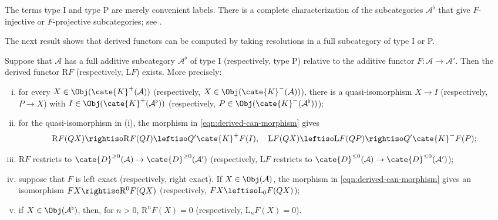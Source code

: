 The terms type I and type P are merely convenient labels. There is a complete
characterization of the subcategories $\mathcal{A}^\flat$ that give
$F$-injective or $F$-projective subcategories; see
\cite[Proposition 13.3.5]{KS06}.

The next result shows that derived functors can be computed by taking
resolutions in a full subcategory of type I or P.

\begin{theorem}\label{prop:derived-via-resolution}
	Suppose that $\mathcal{A}$ has a full additive subcategory
	$\mathcal{A}^\flat$ of type I (respectively, type P) relative to the
	additive functor $F:\mathcal{A}\to\mathcal{A}'$. Then the derived functor
	$\mathrm{R}F$ (respectively, $\mathrm{L}F$) exists. More precisely:
	\begin{enumerate}[(i)]
		\item for every $X\in\Obj(\cate{K}^+(\mathcal{A}))$ (respectively,
		$X\in\Obj(\cate{K}^-(\mathcal{A}))$), there is a quasi-isomorphism
		$X\to I$ (respectively, $P\to X$) with
		$I\in\Obj(\cate{K}^+(\mathcal{A}^\flat))$ (respectively,
		$P\in\Obj(\cate{K}^-(\mathcal{A}^\flat))$);
		\item for the quasi-isomorphism in (i), the morphism in
		\eqref{eqn:derived-can-morphism} gives
		\[ \mathrm{R}F(QX) \rightiso \mathrm{R}F(QI) \leftiso Q' \cate{K}^+ F(I), \quad \mathrm{L}F(QX) \leftiso \mathrm{L}F(QP) \rightiso Q' \cate{K}^- F(P); \]
		\item $\mathrm{R}F$ restricts to
		$\cate{D}^{\geq0}(\mathcal{A})\to\cate{D}^{\geq0}(\mathcal{A}')$
		(respectively, $\mathrm{L}F$ restricts to
		$\cate{D}^{\leq0}(\mathcal{A})\to\cate{D}^{\leq0}(\mathcal{A}')$);
		\item suppose that $F$ is left exact (respectively, right exact). If
		$X\in\Obj(\mathcal{A})$, the morphism in
		\eqref{eqn:derived-can-morphism} gives an isomorphism
		$FX\rightiso\mathrm{R}^0F(QX)$ (respectively,
		$FX\leftiso\mathrm{L}_0F(QX)$);
		\item if $X\in\Obj(\mathcal{A}^\flat)$, then, for $n>0$,
		$\mathrm{R}^nF(X)=0$ (respectively, $\mathrm{L}_nF(X)=0$).
	\end{enumerate}
\end{theorem}
